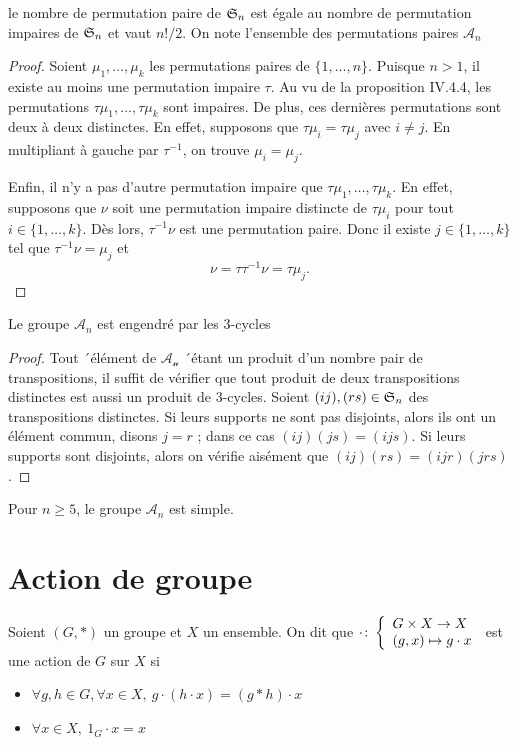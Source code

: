 \begin{proposition}
        le nombre de permutation paire de $\mathfrak{S}_n$ est égale au nombre de permutation impaires de $\mathfrak{S}_n$ et vaut $n!/2$.
        On note l'ensemble des permutations paires $\mathcal{A}_n$
\end{proposition}

\begin{proof}
 Soient \(\mu_1, \dots, \mu_k\) les permutations paires de \(\{1, \dots, n\}\).  
Puisque \(n > 1\), il existe au moins une permutation impaire \(\tau\). Au vu de la proposition IV.4.4, les permutations \(\tau \mu_1, \dots, \tau \mu_k\) sont impaires. De plus, ces dernières permutations sont deux à deux distinctes. En effet, supposons que \(\tau \mu_i = \tau \mu_j\) avec \(i \neq j\). En multipliant à gauche par \(\tau^{-1}\), on trouve \(\mu_i = \mu_j\).  

Enfin, il n’y a pas d’autre permutation impaire que \(\tau \mu_1, \dots, \tau \mu_k\). En effet, supposons que \(\nu\) soit une permutation impaire distincte de \(\tau \mu_i\) pour tout \(i \in \{1, \dots, k\}\). Dès lors, \(\tau^{-1} \nu\) est une permutation paire. Donc il existe \(j \in \{1, \dots, k\}\) tel que \(\tau^{-1} \nu = \mu_j\) et  
\[
\nu = \tau \tau^{-1} \nu = \tau \mu_j.
\]

\end{proof}

\begin{proposition}
        Le groupe $\mathcal{A}_n$ est engendré par les $3$-cycles
\end{proposition}

\begin{proof}
    Tout ´élément de $\mathcal{A_n}$ ´étant un produit d’un nombre pair de transpositions, il suffit de
vérifier que tout produit de deux transpositions distinctes est aussi un produit de 3-cycles.
Soient $(i j),(r s) \in \mathfrak{S}_n$ des transpositions distinctes. Si leurs supports ne sont pas disjoints,
alors ils ont un élément commun, disons $j = r$ ; dans ce cas
$(i j)(j s) = (i j s)$.
Si leurs supports sont disjoints, alors on vérifie aisément que
$(i j)(r s) = (i j r)(j r s)$.
\end{proof}

 \begin{theoreme}
        Pour $n\geq 5$, le groupe $\mathcal{A}_n$ est simple.
    \end{theoreme}

\section{Action de groupe}
\begin{definition}
    Soient $(G,*)$ un groupe et $X$ un ensemble. On dit que $\cdot\colon \left\{\begin{array}{l}G\times X\to X \\(g,x)\mapsto g\cdot x\end{array}\right.$ est une action de $G$ sur $X$ si 
    \begin{itemize}
        \item $\forall g,h\in G, \forall x\in X,\ g\cdot(h\cdot x)=(g*h)\cdot x$
        \item $\forall x\in X,\ 1_G\cdot x = x$
    \end{itemize}
\end{definition}

